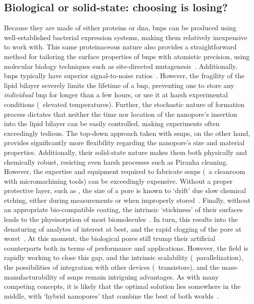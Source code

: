 \subsection{Biological or solid-state: choosing is losing?}
%

Because they are made of either proteins or \gls{dna}, \glspl{bnp} can be produced using well-established
bacterial expression systems, making them relatively inexpensive to work with. This same proteinaceous nature
also provides a straightforward method for tailoring the surface properties of \glspl{bnp} with atomistic
precision, using molecular biology techniques such as site-directed
mutagenesis~\cite{Howorka-2001,RinconRestrepo-2011}. Additionally, \glspl{bnp} typically have superior
signal-to-noise ratios~\cite{Fragasso-2020}. However, the fragility of the lipid bilayer severely limits the
lifetime of a \gls{bnp}, preventing one to store any \emph{individual} \gls{bnp} for longer than a few hours,
or use it at harsh experimental conditions (\eg~elevated temperatures). Further, the stochastic nature of
formation process dictates that neither the time nor location of the nanopore's insertion into the lipid
bilayer can be easily controlled, making experiments often exceedingly tedious. The top-down approach taken
with \glspl{ssnp}, on the other hand, provides significantly more flexibility regarding the nanopore's size
and material properties. Additionally, their solid-state nature makes them both physically and chemically
robust, resisting even harsh processes such as Piranha cleaning. However, the expertise and equipment required
to fabricate \glspl{ssnp} (\ie~a cleanroom with micromachining tools) can be exceedingly expensive. Without a
proper protective layer, such as , the size of a  pore is known to `drift' due slow
chemical etching, either during measurements or when improperly stored~\cite{Chou-2020}. Finally, without an
appropriate bio-compatible coating, the intrinsic `stickiness' of their surfaces leads to the physisorption of
most biomolecules~\cite{Eggenberger-2019,Awasthi-2020}. In turn, this results into the denaturing of analytes
of interest at best, and the rapid clogging of the pore at worst~\cite{Yusko-2011}. At this moment, the
biological pores still trump their artificial counterparts both in terms of performance and applications.
However, the field is rapidly working to close this gap, and the intrinsic scalability (\eg~parallelization),
the possibilities of integration with other devices (\eg~transistors), and the mass-manufacturability of
\glspl{ssnp} remain intriguing advantages. As with many competing concepts, it is likely that the optimal
solution lies somewhere in the middle, with `hybrid nanopores' that combine the best of both
worlds~\cite{Hall-2010,Im-2010,Cai-2018}.

